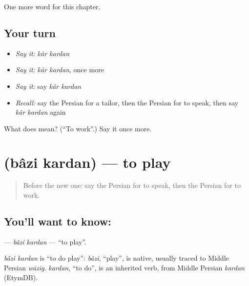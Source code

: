 \begin{grammarlens}[title={What you've built}]
One more word for this chapter.
\end{grammarlens}

\subsection*{Your turn}
\begin{itemize}
\raggedright
  \item \emph{Say it:} \emph{kâr kardan}
  \item \emph{Say it:} \emph{kâr kardan}, once more
  \item \emph{Say it:} say \emph{kâr kardan}
  \item \emph{Recall:} say the Persian for a tailor, then the Persian for to speak, then say \emph{kâr kardan} again
\end{itemize}

\begin{tcolorbox}[breakable,colback=teal!4,colframe=teal!35!black,title={Before you move on}]
What does   mean? (\textquotedblleft{}To work\textquotedblright{}.) Say it once more.
\end{tcolorbox}
\section[\texorpdfstring{\fa{بازی} \fa{کردن} (bâzi kardan)}{بازی کردن (bâzi kardan)}]{  (bâzi kardan) — to play}

\label{lesson:FA-C217-bazi-kardan}



\begin{quote}
Before the new one: say the Persian for to speak, then the Persian for to work.
\end{quote}

\subsection*{You'll want to know:  }
\textbf{ } — \emph{bâzi kardan} — \textquotedblleft{}to play\textquotedblright{}.

\begin{cousinweb}
\emph{bâzi kardan} is \textquotedblleft{}to do play\textquotedblright{}: \emph{bâzi}, \textquotedblleft{}play\textquotedblright{}, is native, usually traced to Middle Persian \emph{wāzīg}. \emph{kardan}, \textquotedblleft{}to do\textquotedblright{}, is an inherited verb, from Middle Persian \emph{kardan} (EtymDB).
\end{cousinweb}

